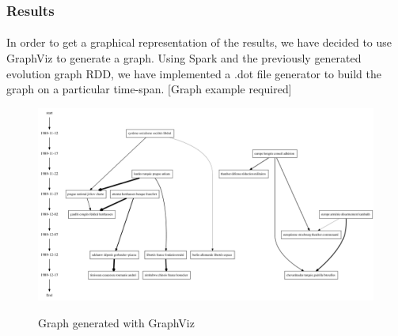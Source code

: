 \subsubsection{Results}
\label{sec:EvoGraphResults}

\paragraph{}
In order to get a graphical representation of the results, we have decided to use GraphViz to generate a graph. Using Spark and the previously generated evolution graph RDD, we have implemented a .dot file generator to build the graph on a particular time-span.
[Graph example required]

\begin{figure}[H]
\begin{center}
	\label{fig:graph}
	\includegraphics[width=15cm]{images/graph}
	\caption{Graph generated with GraphViz}
\end{center}
\end{figure}
